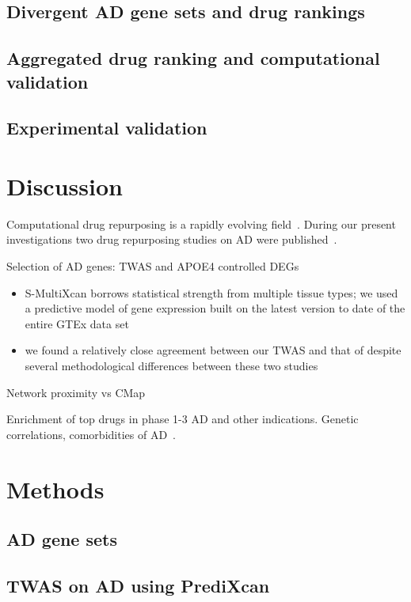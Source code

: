 \documentclass[letterpaper]{article}
\begin{document}
\subsection{Divergent AD gene sets and drug rankings}

\subsection{Aggregated drug ranking and computational validation}

\subsection{Experimental validation}

\section{Discussion}

Computational drug repurposing is a rapidly evolving
field~\citep{Pushpakom2019}.  During our present investigations two drug
repurposing studies on AD were published~\citep{Taubes2021,Fang2021}.

Selection of AD genes: TWAS and APOE4 controlled DEGs
\begin{itemize}
\item S-MultiXcan borrows statistical strength from multiple tissue types; we used
a predictive model of gene expression built on the latest version to date of
the entire GTEx data set
\item we found a relatively close agreement between our TWAS and that of
\cite{Jansen2019} despite
several methodological differences between these two studies 
\end{itemize}

Network proximity vs CMap

Enrichment of top drugs in phase 1-3 AD and other indications.  Genetic
correlations, comorbidities of AD~\citep{Consortium2018,Santiago2021}.

\section{Methods}

\subsection{AD gene sets}

\subsection{TWAS on AD using PrediXcan}
\end{document}
